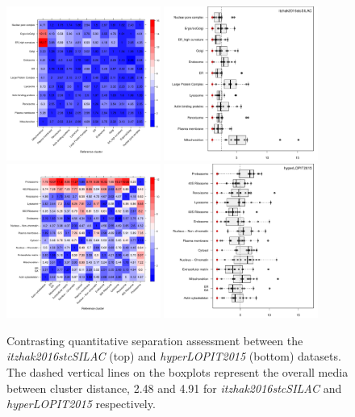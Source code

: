 \documentclass[12pt]{article}\usepackage[]{graphicx}\usepackage[]{color}
\begin{document}
\begin{figure}[h]
  \centering
  \includegraphics[width = 0.45\textwidth]{./figure/qsep0lv-3.pdf}
  \includegraphics[width = 0.45\textwidth]{./figure/qsepcmp-2.pdf}
  \includegraphics[width = 0.45\textwidth]{./figure/qsep0lv-2.pdf}
  \includegraphics[width = 0.45\textwidth]{./figure/qsepcmp-1.pdf}
  \caption{Contrasting quantitative separation assessment between the
    \textit{itzhak2016stcSILAC} \citep{Itzhak:2016} (top) and
    \textit{hyperLOPIT2015} \citep{Christoforou:2016} (bottom)
    datasets. The dashed vertical lines on the boxplots represent the
    overall media between cluster distance, 2.48 and
    4.91 for \textit{itzhak2016stcSILAC} and
    \textit{hyperLOPIT2015} respectively. }
  \label{fig:qsepcmp}
\end{figure}
\end{document}
